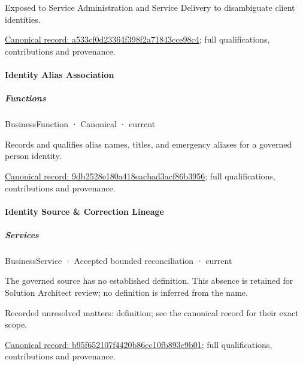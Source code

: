 Exposed to Service Administration and Service Delivery to disambiguate client identities.


{\footnotesize \href{../../../../continuum/business/business-service/a533cf0d23364f398f2a71843cce98c4.md}{Canonical record: a533cf0d23364f398f2a71843cce98c4}; full qualifications, contributions and provenance.}\par
\paragraph{Identity Alias Association}

\subparagraph{Functions}



\label{element:9db2528e180a418eacbad3acf86b3956}
{\small BusinessFunction · Canonical · current}\par

Records and qualifies alias names, titles, and emergency aliases for a governed person identity.


{\footnotesize \href{../../../../continuum/business/business-function/9db2528e180a418eacbad3acf86b3956.md}{Canonical record: 9db2528e180a418eacbad3acf86b3956}; full qualifications, contributions and provenance.}\par
\paragraph{Identity Source \& Correction Lineage}

\subparagraph{Services}



\label{element:b95f652107f4420b86cc10fb893c9b01}
{\small BusinessService · Accepted bounded reconciliation · current}\par

The governed source has no established definition. This absence is retained for Solution Architect review; no definition is inferred from the name.


{\small Recorded unresolved matters: definition; see the canonical record for their exact scope.}\par
{\footnotesize \href{../../../../continuum/business/business-service/b95f652107f4420b86cc10fb893c9b01.md}{Canonical record: b95f652107f4420b86cc10fb893c9b01}; full qualifications, contributions and provenance.}\par
